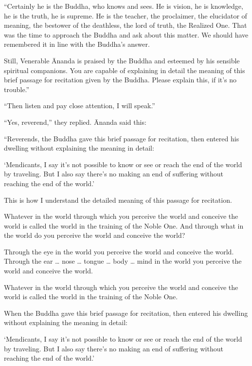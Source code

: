 \documentclass[12pt,openany]{book}%
\begin{document}
“Certainly he is the Buddha, who knows and sees. He is vision, he is knowledge, he is the truth, he is supreme. He is the teacher, the proclaimer, the elucidator of meaning, the bestower of the deathless, the lord of truth, the Realized One. That was the time to approach the Buddha and ask about this matter. We should have remembered it in line with the Buddha’s answer. 

Still, Venerable Ānanda is praised by the Buddha and esteemed by his sensible spiritual companions. You are capable of explaining in detail the meaning of this brief passage for recitation given by the Buddha. Please explain this, if it’s no trouble.” 

“Then listen and pay close attention, I will speak.” 

“Yes, reverend,” they replied. Ānanda said this: 

“Reverends, the Buddha gave this brief passage for recitation, then entered his dwelling without explaining the meaning in detail: 

‘Mendicants, I say it’s not possible to know or see or reach the end of the world by traveling. But I also say there’s no making an end of suffering without reaching the end of the world.’ 

This is how I understand the detailed meaning of this passage for recitation. 

Whatever in the world through which you perceive the world and conceive the world is called the world in the training of the Noble One. And through what in the world do you perceive the world and conceive the world? 

Through the eye in the world you perceive the world and conceive the world. Through the ear … nose … tongue … body … mind in the world you perceive the world and conceive the world. 

Whatever in the world through which you perceive the world and conceive the world is called the world in the training of the Noble One. 

When the Buddha gave this brief passage for recitation, then entered his dwelling without explaining the meaning in detail: 

‘Mendicants, I say it’s not possible to know or see or reach the end of the world by traveling. But I also say there’s no making an end of suffering without reaching the end of the world.’ 
\end{document}
